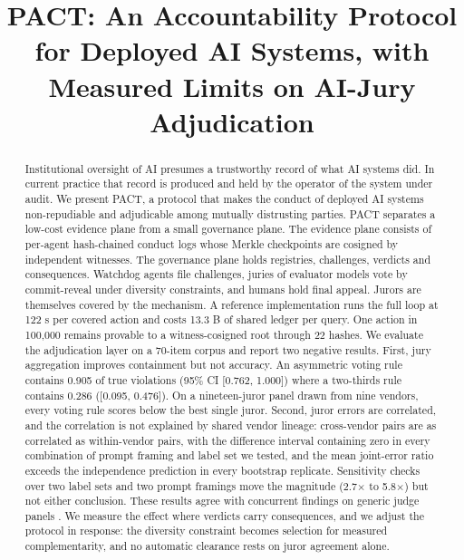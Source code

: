 \documentclass[conference]{IEEEtran}
\begin{document}
\title{PACT: An Accountability Protocol for Deployed AI Systems, with Measured Limits on AI-Jury Adjudication}

\author{
}

\maketitle

\begin{abstract}
Institutional oversight of AI presumes a trustworthy record of what AI systems did. In current practice that record is produced and held by the operator of the system under audit. We present PACT, a protocol that makes the conduct of deployed AI systems non-repudiable and adjudicable among mutually distrusting parties. PACT separates a low-cost evidence plane from a small governance plane. The evidence plane consists of per-agent hash-chained conduct logs whose Merkle checkpoints are cosigned by independent witnesses. The governance plane holds registries, challenges, verdicts and consequences. Watchdog agents file challenges, juries of evaluator models vote by commit-reveal under diversity constraints, and humans hold final appeal. Jurors are themselves covered by the mechanism. A reference implementation runs the full loop at 122 \textmu{}s per covered action and costs 13.3 B of shared ledger per query. One action in 100,000 remains provable to a witness-cosigned root through 22 hashes. We evaluate the adjudication layer on a 70-item corpus and report two negative results. First, jury aggregation improves containment but not accuracy. An asymmetric voting rule contains 0.905 of true violations (95\% CI [0.762, 1.000]) where a two-thirds rule contains 0.286 ([0.095, 0.476]). On a nineteen-juror panel drawn from nine vendors, every voting rule scores below the best single juror. Second, juror errors are correlated, and the correlation is not explained by shared vendor lineage: cross-vendor pairs are as correlated as within-vendor pairs, with the difference interval containing zero in every combination of prompt framing and label set we tested, and the mean joint-error ratio exceeds the independence prediction in every bootstrap replicate. Sensitivity checks over two label sets and two prompt framings move the magnitude (2.7$\times$ to 5.8$\times$) but not either conclusion. These results agree with concurrent findings on generic judge panels \cite{r39,r40}. We measure the effect where verdicts carry consequences, and we adjust the protocol in response: the diversity constraint becomes selection for measured complementarity, and no automatic clearance rests on juror agreement alone.
\end{abstract}
\end{document}
